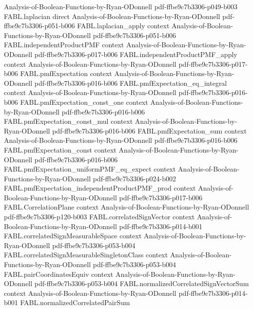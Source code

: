 \begin{theorem}
  {Analysis-of-Boolean-Functions-by-Ryan-ODonnell}
  {pdf-ffbe9c7b3306-p049-b003}
\proofstep
  {FABL.laplacian}
  {direct}
  {Analysis-of-Boolean-Functions-by-Ryan-ODonnell}
  {pdf-ffbe9c7b3306-p051-b006}
\proofstep
  {FABL.laplacian_apply}
  {context}
  {Analysis-of-Boolean-Functions-by-Ryan-ODonnell}
  {pdf-ffbe9c7b3306-p051-b006}
\proofstep
  {FABL.independentProductPMF}
  {context}
  {Analysis-of-Boolean-Functions-by-Ryan-ODonnell}
  {pdf-ffbe9c7b3306-p017-b006}
\proofstep
  {FABL.independentProductPMF_apply}
  {context}
  {Analysis-of-Boolean-Functions-by-Ryan-ODonnell}
  {pdf-ffbe9c7b3306-p017-b006}
\proofstep
  {FABL.pmfExpectation}
  {context}
  {Analysis-of-Boolean-Functions-by-Ryan-ODonnell}
  {pdf-ffbe9c7b3306-p016-b006}
\proofstep
  {FABL.pmfExpectation_eq_integral}
  {context}
  {Analysis-of-Boolean-Functions-by-Ryan-ODonnell}
  {pdf-ffbe9c7b3306-p016-b006}
\proofstep
  {FABL.pmfExpectation_const_one}
  {context}
  {Analysis-of-Boolean-Functions-by-Ryan-ODonnell}
  {pdf-ffbe9c7b3306-p016-b006}
\proofstep
  {FABL.pmfExpectation_const_mul}
  {context}
  {Analysis-of-Boolean-Functions-by-Ryan-ODonnell}
  {pdf-ffbe9c7b3306-p016-b006}
\proofstep
  {FABL.pmfExpectation_sum}
  {context}
  {Analysis-of-Boolean-Functions-by-Ryan-ODonnell}
  {pdf-ffbe9c7b3306-p016-b006}
\proofstep
  {FABL.pmfExpectation_const}
  {context}
  {Analysis-of-Boolean-Functions-by-Ryan-ODonnell}
  {pdf-ffbe9c7b3306-p016-b006}
\proofstep
  {FABL.pmfExpectation_uniformPMF_eq_expect}
  {context}
  {Analysis-of-Boolean-Functions-by-Ryan-ODonnell}
  {pdf-ffbe9c7b3306-p024-b002}
\proofstep
  {FABL.pmfExpectation_independentProductPMF_prod}
  {context}
  {Analysis-of-Boolean-Functions-by-Ryan-ODonnell}
  {pdf-ffbe9c7b3306-p017-b006}
\proofstep
  {FABL.CorrelationPlane}
  {context}
  {Analysis-of-Boolean-Functions-by-Ryan-ODonnell}
  {pdf-ffbe9c7b3306-p120-b003}
\proofstep
  {FABL.correlatedSignVector}
  {context}
  {Analysis-of-Boolean-Functions-by-Ryan-ODonnell}
  {pdf-ffbe9c7b3306-p014-b001}
\proofstep
  {FABL.correlatedSignMeasurableSpace}
  {context}
  {Analysis-of-Boolean-Functions-by-Ryan-ODonnell}
  {pdf-ffbe9c7b3306-p053-b004}
\proofstep
  {FABL.correlatedSignMeasurableSingletonClass}
  {context}
  {Analysis-of-Boolean-Functions-by-Ryan-ODonnell}
  {pdf-ffbe9c7b3306-p053-b004}
\proofstep
  {FABL.pairCoordinatesEquiv}
  {context}
  {Analysis-of-Boolean-Functions-by-Ryan-ODonnell}
  {pdf-ffbe9c7b3306-p053-b004}
\proofstep
  {FABL.normalizedCorrelatedSignVectorSum}
  {context}
  {Analysis-of-Boolean-Functions-by-Ryan-ODonnell}
  {pdf-ffbe9c7b3306-p014-b001}
\proofstep
  {FABL.normalizedCorrelatedPairSum}

\end{theorem}
